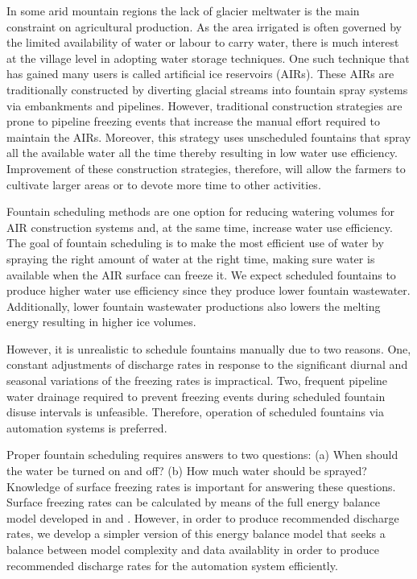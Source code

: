 \documentclass[tc, manuscript]{copernicus}
\begin{document}
\introduction

In some arid mountain regions the lack of glacier meltwater is the main constraint on agricultural production.
As the area irrigated is often governed by the limited availability of water or labour to carry water, there is
much interest at the village level in adopting water storage techniques. One such technique that has gained many
users is called artificial ice reservoirs (AIRs). These AIRs are traditionally constructed by diverting glacial
streams into fountain spray systems via embankments and pipelines. However, traditional construction strategies
are prone to pipeline freezing events that increase the manual effort required to maintain the AIRs. Moreover,
this strategy uses unscheduled fountains that spray all the available water all the time thereby resulting in
low water use efficiency. Improvement of these construction strategies, therefore, will allow the farmers to
cultivate larger areas or to devote more time to other activities. 

Fountain scheduling methods are one option for reducing watering volumes for AIR construction systems and, at
the same time, increase water use efficiency. The goal of fountain scheduling is to make the most efficient use
of water by spraying the right amount of water at the right time, making sure water is available when the AIR
surface can freeze it. We expect scheduled fountains to produce higher water use efficiency since they produce
lower fountain wastewater. Additionally, lower fountain wastewater productions also lowers the melting energy
resulting in higher ice volumes.

However, it is unrealistic to schedule fountains manually due to two reasons. One, constant adjustments of
discharge rates in response to the significant diurnal and seasonal variations of the freezing rates is
impractical. Two, frequent pipeline water drainage required to prevent freezing events during scheduled fountain
disuse intervals is unfeasible. Therefore, operation of scheduled fountains via automation systems is preferred.

Proper fountain scheduling requires answers to two questions: (a) When should the water be turned on and off?
(b) How much water should be sprayed? Knowledge of surface freezing rates is important for answering these
questions. Surface freezing rates can be calculated by means of the full energy balance model developed in
\cite{balasubramanianInfluenceMeteorologicalConditions2022} and \cite{oerlemansBriefCommunicationGrowth2021}.
However, in order to produce recommended discharge rates, we develop a simpler version of this energy balance
model that seeks a balance between model complexity and data availablity in order to produce recommended
discharge rates for the automation system efficiently.
\end{document}
